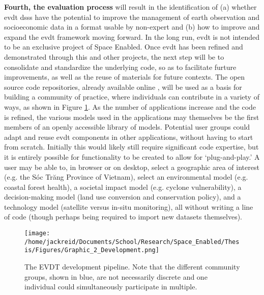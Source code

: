 \documentclass[notitlepage]{article}
\begin{document}
\textbf{Fourth, the evaluation process} will result in the identification of (a) whether \ac{evdt} \acp{dss} have the potential to improve the management of earth observation and socioeconomic data in a format usable by non-expert and (b) how to improve and expand the \ac{evdt} framework moving forward. In the long run, \ac{evdt} is not intended to be an exclusive project of Space Enabled. Once \ac{evdt} has been refined and demonstrated through this and other projects, the next step will be to consolidate and standardize the underlying code, so as to facilitate furture improvements, as well as the reuse of materials for future contexts. The open source code repositories, already available online \cite{bluerasterBlueRasterVida2021,reidEVDTRepository2020,reidMITVidaRepository2021}, will be used as a basis for building a community of practice, where individuals can contribute in a variety of ways, as shown in Figure \ref{fig:development}. As the number of applications increase and the code is refined, the various models used in the applications may themselves be the first members of an openly accessible library of models. Potential user groups could adapt and reuse \ac{evdt} components in other applications, without having to start from scratch. Initially this would likely still require significant code expertise, but it is entirely possible for functionality to be created to allow for `plug-and-play.' A user may be able to, in browser or on desktop, select a geographic area of interest (e.g. the Sóc Trăng Province of Vietnam), select an environmental model (e.g. coastal forest health), a societal impact model (e.g. cyclone vulnerability), a decision-making model (land use conversion and conservation policy), and a technology model (satellite versus in-situ monitoring), all without writing a line of code (though perhaps being required to import new datasets themselves).

\begin{figure}[h]
	\centering
	\texttt{[image: /home/jackreid/Documents/School/Research/Space\_Enabled/Thesis/Figures/Graphic\_2\_Development.png]}
	\caption{The EVDT development pipeline. Note that the different community groups, shown in blue, are not necessarily discrete and one individual could simultaneously participate in multiple.}
	\label{fig:development}
\end{figure}
\end{document}
